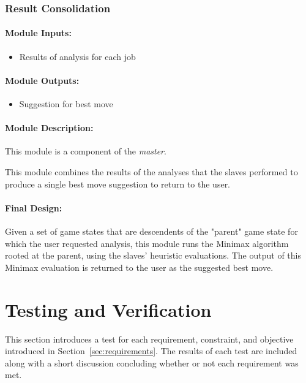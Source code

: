 \documentclass[pdftex,12pt,a4paper]{article}
\begin{document}
\subsubsection{Result Consolidation}

\paragraph{Module Inputs:}
\begin{itemize}
\item Results of analysis for each job
\end{itemize}

\paragraph{Module Outputs:}
\begin{itemize}
\item Suggestion for best move
\end{itemize}

\paragraph{Module Description:\\}
This module is a component of the \emph{master}.

This module combines the results of the analyses that the slaves performed to produce a single best move suggestion to return to the user.

\paragraph{Final Design:\\}
Given a set of game states that are descendents of the "parent" game state for which the user requested analysis, this module runs the Minimax algorithm rooted at the parent, using the slaves' heuristic evaluations. The output of this Minimax evaluation is returned to the user as the suggested best move.


%
%
\section{Testing and Verification}

This section introduces a test for each requirement, constraint, and objective introduced in Section~\ref{sec:requirements}. The results of each test are included along with a short discussion concluding whether or not each requirement was met.
\end{document}
